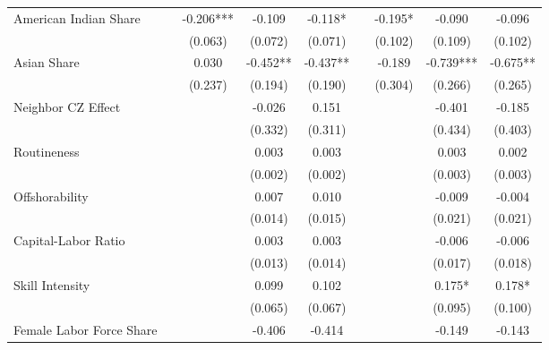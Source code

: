 \begin{table}[htbp]
\begin{tabular}{l*{8}{c}}
\addlinespace
American Indian Share&            &   -0.206***&   -0.109   &   -0.118*  &            &   -0.195*  &   -0.090   &   -0.096   \\
                    &            &  (0.063)   &  (0.072)   &  (0.071)   &            &  (0.102)   &  (0.109)   &  (0.102)   \\
\addlinespace
Asian Share         &            &    0.030   &   -0.452** &   -0.437** &            &   -0.189   &   -0.739***&   -0.675** \\
                    &            &  (0.237)   &  (0.194)   &  (0.190)   &            &  (0.304)   &  (0.266)   &  (0.265)   \\
\addlinespace
Neighbor CZ Effect  &            &            &   -0.026   &    0.151   &            &            &   -0.401   &   -0.185   \\
                    &            &            &  (0.332)   &  (0.311)   &            &            &  (0.434)   &  (0.403)   \\
\addlinespace
Routineness         &            &            &    0.003   &    0.003   &            &            &    0.003   &    0.002   \\
                    &            &            &  (0.002)   &  (0.002)   &            &            &  (0.003)   &  (0.003)   \\
\addlinespace
Offshorability      &            &            &    0.007   &    0.010   &            &            &   -0.009   &   -0.004   \\
                    &            &            &  (0.014)   &  (0.015)   &            &            &  (0.021)   &  (0.021)   \\
\addlinespace
Capital-Labor Ratio &            &            &    0.003   &    0.003   &            &            &   -0.006   &   -0.006   \\
                    &            &            &  (0.013)   &  (0.014)   &            &            &  (0.017)   &  (0.018)   \\
\addlinespace
Skill Intensity     &            &            &    0.099   &    0.102   &            &            &    0.175*  &    0.178*  \\
                    &            &            &  (0.065)   &  (0.067)   &            &            &  (0.095)   &  (0.100)   \\
\addlinespace
Female Labor Force Share&            &            &   -0.406   &   -0.414   &            &            &   -0.149   &   -0.143   \\

\end{tabular}
\end{table}
